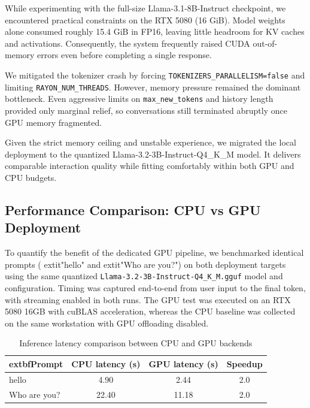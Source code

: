 \documentclass[12pt,a4paper]{article}
\begin{document}
While experimenting with the full-size Llama-3.1-8B-Instruct checkpoint, we encountered practical constraints on the RTX 5080 (16 GiB). Model weights alone consumed roughly 15.4 GiB in FP16, leaving little headroom for KV caches and activations. Consequently, the system frequently raised CUDA out-of-memory errors even before completing a single response.

We mitigated the tokenizer crash by forcing \texttt{TOKENIZERS\_PARALLELISM=false} and limiting \texttt{RAYON\_NUM\_THREADS}. However, memory pressure remained the dominant bottleneck. Even aggressive limits on \texttt{max\_new\_tokens} and history length provided only marginal relief, so conversations still terminated abruptly once GPU memory fragmented.

Given the strict memory ceiling and unstable experience, we migrated the local deployment to the quantized Llama-3.2-3B-Instruct-Q4\_K\_M model. It delivers comparable interaction quality while fitting comfortably within both GPU and CPU budgets.


\subsection{Performance Comparison: CPU vs GPU Deployment}

To quantify the benefit of the dedicated GPU pipeline, we benchmarked identical prompts (	extit{"hello"} and 	extit{"Who are you?"}) on both deployment targets using the same quantized \texttt{Llama-3.2-3B-Instruct-Q4\_K\_M.gguf} model and configuration. Timing was captured end-to-end from user input to the final token, with streaming enabled in both runs. The GPU test was executed on an RTX 5080 16GB with cuBLAS acceleration, whereas the CPU baseline was collected on the same workstation with GPU offloading disabled.

\begin{table}[H]
    \centering
    \caption{Inference latency comparison between CPU and GPU backends}
    \label{tab:cpu_gpu_latency}
    \begin{tabular}{|l|c|c|c|}
        \hline
        	extbf{Prompt} & \textbf{CPU latency (s)} & \textbf{GPU latency (s)} & \textbf{Speedup} \\
        \hline
        hello & 4.90 & 2.44 & 2.0\texttimes{} \\
        Who are you? & 22.40 & 11.18 & 2.0\texttimes{} \\
        \hline
    \end{tabular}
\end{table}
\end{document}
